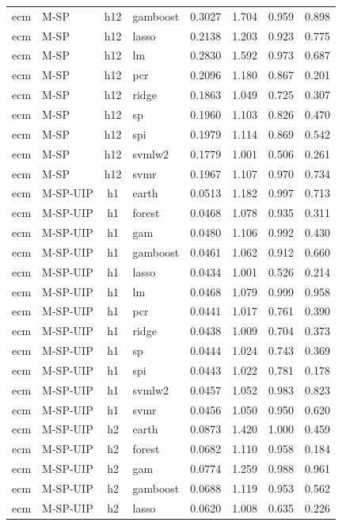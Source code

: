 \begin{ThreePartTable}
\begin{longtable}[t]{llclcccc}
ecm & M-SP & h12 & gamboost & 0.3027 & 1.704 & 0.959 & 0.898\\
ecm & M-SP & h12 & lasso & 0.2138 & 1.203 & 0.923 & 0.775\\
ecm & M-SP & h12 & lm & 0.2830 & 1.592 & 0.973 & 0.687\\
ecm & M-SP & h12 & pcr & 0.2096 & 1.180 & 0.867 & 0.201\\
ecm & M-SP & h12 & ridge & 0.1863 & 1.049 & 0.725 & 0.307\\
ecm & M-SP & h12 & sp & 0.1960 & 1.103 & 0.826 & 0.470\\
ecm & M-SP & h12 & spi & 0.1979 & 1.114 & 0.869 & 0.542\\
ecm & M-SP & h12 & svmlw2 & 0.1779 & 1.001 & 0.506 & 0.261\\
ecm & M-SP & h12 & svmr & 0.1967 & 1.107 & 0.970 & 0.734\\
\addlinespace
ecm & M-SP-UIP & h1 & earth & 0.0513 & 1.182 & 0.997 & 0.713\\
ecm & M-SP-UIP & h1 & forest & 0.0468 & 1.078 & 0.935 & 0.311\\
ecm & M-SP-UIP & h1 & gam & 0.0480 & 1.106 & 0.992 & 0.430\\
ecm & M-SP-UIP & h1 & gamboost & 0.0461 & 1.062 & 0.912 & 0.660\\
ecm & M-SP-UIP & h1 & lasso & 0.0434 & 1.001 & 0.526 & 0.214\\
ecm & M-SP-UIP & h1 & lm & 0.0468 & 1.079 & 0.999 & 0.958\\
ecm & M-SP-UIP & h1 & pcr & 0.0441 & 1.017 & 0.761 & 0.390\\
ecm & M-SP-UIP & h1 & ridge & 0.0438 & 1.009 & 0.704 & 0.373\\
ecm & M-SP-UIP & h1 & sp & 0.0444 & 1.024 & 0.743 & 0.369\\
ecm & M-SP-UIP & h1 & spi & 0.0443 & 1.022 & 0.781 & 0.178\\
ecm & M-SP-UIP & h1 & svmlw2 & 0.0457 & 1.052 & 0.983 & 0.823\\
ecm & M-SP-UIP & h1 & svmr & 0.0456 & 1.050 & 0.950 & 0.620\\
\addlinespace
ecm & M-SP-UIP & h2 & earth & 0.0873 & 1.420 & 1.000 & 0.459\\
ecm & M-SP-UIP & h2 & forest & 0.0682 & 1.110 & 0.958 & 0.184\\
ecm & M-SP-UIP & h2 & gam & 0.0774 & 1.259 & 0.988 & 0.961\\
ecm & M-SP-UIP & h2 & gamboost & 0.0688 & 1.119 & 0.953 & 0.562\\
ecm & M-SP-UIP & h2 & lasso & 0.0620 & 1.008 & 0.635 & 0.226\\

\end{longtable}
\end{ThreePartTable}
